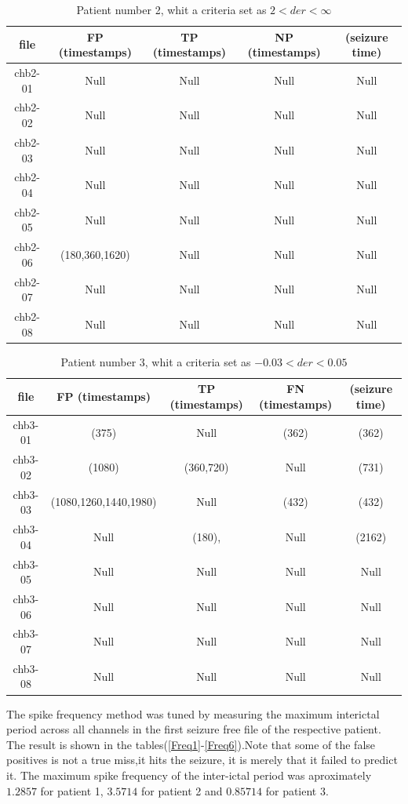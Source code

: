 \begin{table}[H]
\centering
    \begin{tabular}{c | c |c |c | c}
        \hline
         file &  FP (timestamps) & TP (timestamps) & NP (timestamps) & (seizure time)  \\
        \hline
        chb2-01 & Null & Null & Null  & Null  \\
        chb2-02 & Null & Null & Null & Null \\
        chb2-03 & Null & Null & Null & Null  \\
        chb2-04	& Null & Null & Null & Null\\
        chb2-05 & Null & Null & Null & Null\\
        chb2-06 & (180,360,1620) & Null & Null & Null\\
        chb2-07 &  Null & Null & Null & Null  \\
        chb2-08 &  Null & Null & Null & Null  \\
        \hline
     \end{tabular} 
\caption{Patient number 2, whit a criteria set as $2< der < \infty$ }
\label{Der2}
\end{table}


\begin{table}[H]
\centering
    \begin{tabular}{c | c |c |c | c}
        \hline
         file &  FP (timestamps) & TP (timestamps) & FN (timestamps) & (seizure time)  \\
        \hline
        chb3-01 & (375) & Null & (362)  & (362)  \\
        chb3-02 & (1080) & (360,720) & Null & (731) \\
        chb3-03 & (1080,1260,1440,1980)& Null & (432) & (432)  \\
       chb3-04	& Null & (180), & Null & (2162)\\
        chb3-05 & Null & Null & Null & Null\\
        chb3-06 & Null & Null & Null & Null\\
        chb3-07 &  Null & Null & Null & Null  \\
        chb3-08 &  Null & Null & Null & Null  \\
        \hline
     \end{tabular} 
\caption{Patient number 3, whit a criteria set as $-0.03< der < 0.05$ }
\label{Der3}
\end{table}


The spike frequency method was tuned by measuring the maximum interictal period across all channels in the first seizure free file of the respective patient. The result is shown in the tables(\ref{Freq1}-\ref{Freq6}).Note that some of the false positives is not a true miss,it hits the seizure, it is merely that it failed to predict it. The maximum spike frequency of the inter-ictal period was aproximately $1.2857$ for patient 1, $3.5714$ for patient 2 and $0.85714$ for patient 3.


